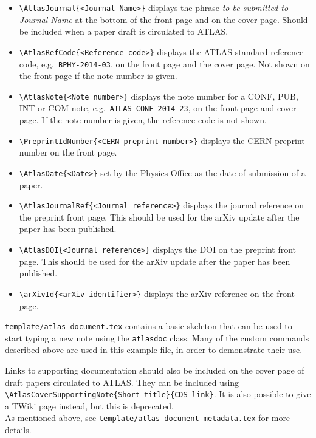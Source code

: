 \begin{itemize}
  \item {\verb|\AtlasJournal{<Journal Name>}|} displays the phrase \emph{to
    be submitted to Journal Name} at the bottom of the front page and
    on the cover page.
    Should be included when a paper draft is circulated to ATLAS.

  \item {\verb|\AtlasRefCode{<Reference code>}|} displays the ATLAS
    standard reference code, e.g.\ \texttt{BPHY-2014-03}, on the front page and
    the cover page. Not shown on the front page if the note number is given.

  \item {\verb|\AtlasNote{<Note number>}|} displays the note number
    for a CONF, PUB, INT or COM note, e.g.\ \texttt{ATLAS-CONF-2014-23},
    on the front page and cover page.
    If the note number is given, the reference code is not shown.

  \item {\verb|\PreprintIdNumber{<CERN preprint number>}|} displays the CERN
    preprint number on the front page.
    
  \item {\verb|\AtlasDate{<Date>}|} set by the Physics Office as the date of submission of a paper.

  \item {\verb|\AtlasJournalRef{<Journal reference>}|} displays the journal reference
    on the preprint front page.
    This should be used for the arXiv update after the paper has been published.

  \item {\verb|\AtlasDOI{<Journal reference>}|} displays the DOI
    on the preprint front page.
    This should be used for the arXiv update after the paper has been published.

  \item {\verb|\arXivId{<arXiv identifier>}|} displays the arXiv reference
    on the front page.

\end{itemize}
%
\texttt{template/atlas-document.tex} contains a basic skeleton that can be
used to start typing a new note using the \texttt{atlasdoc} class. Many of
the custom commands described above are used in this example file, in
order to demonstrate their use.

Links to supporting documentation should also be included on the cover page of draft papers circulated to ATLAS.
They can be included using
\verb|\AtlasCoverSupportingNote{Short title}{CDS link}|.
It is also possible to give a TWiki page instead, but this is deprecated.\\
As mentioned above, see \texttt{template/atlas-document-metadata.tex} for more details.


